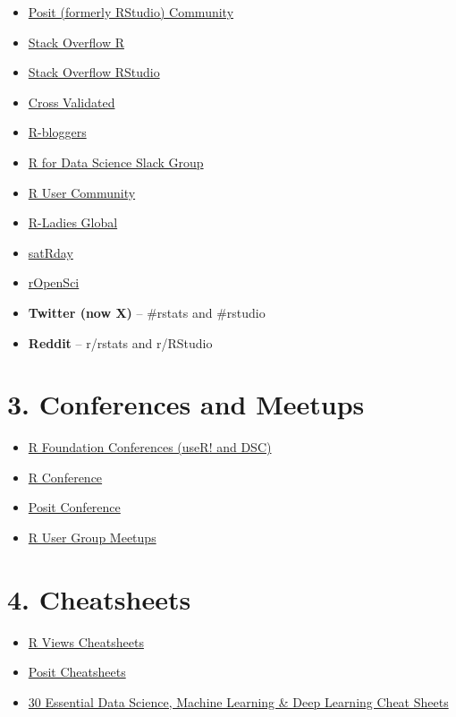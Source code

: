 \documentclass[
  letterpaper,
  DIV=11,
  numbers=noendperiod]{scrreprt}
\providecommand{\tightlist}{%
  \setlength{\itemsep}{0pt}\setlength{\parskip}{0pt}}\usepackage{longtable,booktabs,array}
\begin{document}
\begin{itemize}
\tightlist
\item
  \href{https://community.rstudio.com/}{Posit (formerly RStudio)
  Community}
\item
  \href{https://stackoverflow.com/questions/tagged/r}{Stack Overflow R}
\item
  \href{https://stackoverflow.com/questions/tagged/rstudio}{Stack
  Overflow RStudio}
\item
  \href{https://stats.stackexchange.com/?tags=r}{Cross Validated}
\item
  \href{https://www.r-bloggers.com/}{R-bloggers}
\item
  \href{https://rfordatasci.com/}{R for Data Science Slack Group}
\item
  \href{https://www.linkedin.com/company/r-user-community/}{R User
  Community}
\item
  \href{https://rladies.org/}{R-Ladies Global}
\item
  \href{https://satrdays.org/}{satRday}
\item
  \href{https://ropensci.org/community/}{rOpenSci}
\item
  \textbf{Twitter (now X)} -- \#rstats and \#rstudio
\item
  \textbf{Reddit} -- r/rstats and r/RStudio
\end{itemize}

\section{3. Conferences and Meetups}\label{conferences-and-meetups}

\begin{itemize}
\tightlist
\item
  \href{https://www.r-project.org/conferences/}{R Foundation Conferences
  (useR! and DSC)}
\item
  \href{https://rstats.ai/}{R Conference}
\item
  \href{https://posit.co/conference/}{Posit Conference}
\item
  \href{https://www.meetup.com/pro/r-user-groups/}{R User Group Meetups}
\end{itemize}

\section{4. Cheatsheets}\label{cheatsheets}

\begin{itemize}
\tightlist
\item
  \href{https://rviews.rstudio.com/2021/03/10/rstudio-open-source-resorurces/}{R
  Views Cheatsheets}
\item
  \href{https://posit.co/resources/cheatsheets/}{Posit Cheatsheets}
\item
  \href{https://www.kdnuggets.com/2017/09/essential-data-science-machine-learning-deep-learning-cheat-sheets.html}{30
  Essential Data Science, Machine Learning \& Deep Learning Cheat
  Sheets}
\end{itemize}
\end{document}
